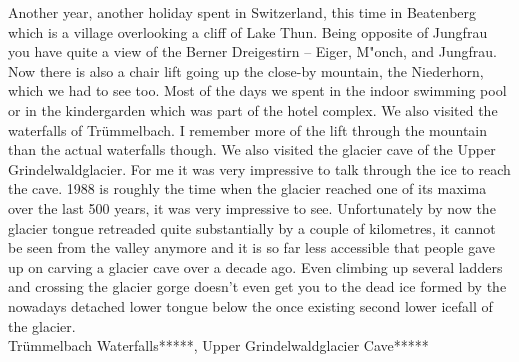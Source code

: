 Another year, another holiday spent in Switzerland, this time in Beatenberg which is a village overlooking a cliff of Lake Thun. Being opposite of Jungfrau you have quite a view of the Berner Dreigestirn -- Eiger, M"onch, and Jungfrau. Now there is also a chair lift going up the close-by mountain, the Niederhorn, which we had to see too. Most of the days we spent in the indoor swimming pool or in the kindergarden which was part of the hotel complex. We also visited the waterfalls of Tr\"ummelbach. I remember more of the lift through the mountain than the actual waterfalls though. We also visited the glacier cave of the Upper Grindelwaldglacier. For me it was very impressive to talk through the ice to reach the cave. 1988 is roughly the time when the glacier reached one of its maxima over the last 500 years, it was very impressive to see. Unfortunately by now the glacier tongue retreaded quite substantially by a couple of kilometres, it cannot be seen from the valley anymore and it is so far less accessible that people gave up on carving a glacier cave over a decade ago. Even climbing up several ladders and crossing the glacier gorge doesn't even get you to the dead ice formed by the nowadays detached lower tongue below the once existing second lower icefall of the glacier.\\

Tr\"ummelbach Waterfalls*****, Upper Grindelwaldglacier Cave*****


